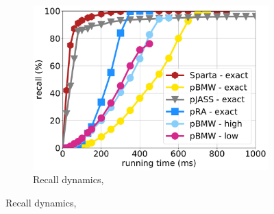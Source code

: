 {{\begin{figure}[tbh]
\begin{subfigure}{0.325\textwidth}
         \includegraphics[width=\textwidth]{figures/cumulative_12threads_clueweb.pdf}
        \caption{Recall dynamics, \cw}
        \label{fig:dynamics-clueweb}
      \end{subfigure} 
	

\end{figure}}}
